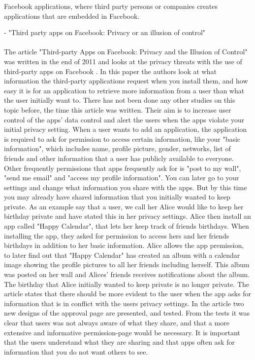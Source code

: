 Facebook applications, where third party persons or companies creates applications that are embedded in Facebook. 



- "Third party apps on Facebook: Privacy or an illusion of control"
\paragraph{}
The article "Third-party Apps on Facebook: Privacy and the Illusion of Control" was written in the end of 2011 and looks at the privacy threats with the use of third-party apps on Facebook \cite{thirdPartyApps}. In this paper the authors look at what information the third-party applications request when you install them, and how easy it is for an application to retrieve more information from a user than what the user initially want to. There has not been done any other studies on this topic before, the time this article was written. Their aim is to increase user control of the apps' data control and alert the users when the apps violate your initial privacy setting. When a user wants to add an application, the application is required to ask for permission to access certain information, like your "basic information", which includes name, profile picture, gender, networks, list of friends and other information that a user has publicly available to everyone. Other frequently permissions that apps frequently ask for is "post to my wall", "send me email" and "access my profile information". You can later go to your settings and change what information you share with the apps. But by this time you may already have shared information that you initially wanted to keep private. As an example say that a user, we call her Alice would like to keep her birthday private and have stated this in her privacy settings. Alice then install an app called "Happy Calendar", that lets her keep track of friends birthdays. When installing the app, they asked for permission to access hers and her friends birthdays in addition to her basic information. Alice allows the app premission, to later find out that "Happy Calendar" has created an album with a calendar image showing the profile pictures to all her friends including herself. This album was posted on her wall and Alices' friends receives notifications about the album. The birthday that Alice initially wanted to keep private is no longer private. The article states that there should be more evident to the user when the app asks for information that is in conflict with the users privacy settings. In the article two new designs of the approval page are presented, and tested.  From the tests it was clear that users was not always aware of what they share, and that a more extensive and informative permission-page would be necessary. It is important that the users understand what they are sharing and that apps often ask for information that you do not want others to see.




